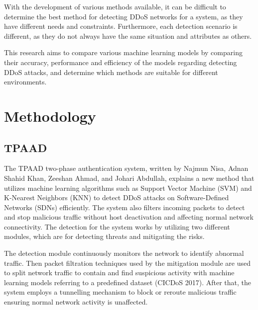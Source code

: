 \documentclass[a4paper, 12pt]{article}
\begin{document}
With the development of various methods available, it can be difficult to determine the best method for detecting DDoS networks for a system, as they have different needs and constraints. Furthermore, each detection scenario is different, as they do not always have the same situation and attributes as others. 

This research aims to compare various machine learning models by comparing their accuracy, performance and efficiency of the models regarding detecting DDoS attacks, and determine which methods are suitable for different environments. 

\section{Methodology}
\subsection{TPAAD}
The TPAAD two-phase authentication system, written by Najmun Nisa, Adnan Shahid Khan, Zeeshan Ahmad, and Johari Abdullah, explains a new method that utilizes machine learning algorithms such as Support Vector Machine (SVM) and K-Nearest Neighbors (KNN) to detect DDoS attacks on Software-Defined Networks (SDNs) efficiently. The system also filters incoming packets to detect and stop malicious traffic without host deactivation and affecting normal network connectivity.  The detection for the system works by utilizing two different modules, which are for detecting threats and mitigating the risks. 

The detection module continuously monitors the network to identify abnormal traffic. Then packet filtration techniques used by the mitigation module are used to split network traffic to contain and find suspicious activity with machine learning models referring to a predefined dataset (CICDoS 2017). After that, the system employs a tunnelling mechanism to block or reroute malicious traffic ensuring normal network activity is unaffected. 
\end{document}
